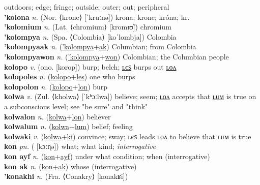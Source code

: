 outdoors; edge; fringe; outside; outer; out; peripheral \label{kolon} \\
\textbf{'kolona} \textit{n.} (Nor. ⟨krone⟩ [ˈkruːnə])
krona; krone; króna; kr. \label{'kolona} \\
\textbf{'kolomium} \textit{n.} (Lat. ⟨chromium⟩ [kromɪʊ̃])
chromium \label{'kolomium} \\
\textbf{'kolompya} \textit{n.} (Spa. ⟨Colombia⟩ [koˈlombja])
Colombia \label{'kolompya} \\
\textbf{'kolompyaak} \textit{n.} (\hyperref['kolompya]{'kolompya}+\hyperref[ak]{ak})
Columbian; from Colombia \label{'kolompyaak} \\
\textbf{'kolompyawon} \textit{n.} (\hyperref['kolompya]{'kolompya}+\hyperref[won]{won})
Colombian; the Columbian people \label{'kolompyawon} \\
\textbf{kolopo} \textit{v.} (ono. [korop])
burp; belch; \hyperref[kolopoles]{ʟєꜱ} burps out \hyperref[kolopolon]{ʟᴏᴧ} \label{kolopo} \\
\textbf{kolopoles} \textit{n.} (\hyperref[kolopo]{kolopo}+\hyperref[les]{les})
one who burps \label{kolopoles} \\
\textbf{kolopolon} \textit{n.} (\hyperref[kolopo]{kolopo}+\hyperref[lon]{lon})
burp \label{kolopolon} \\
\textbf{kolwa} \textit{v.} (Zul. ⟨kholwa⟩ [ˈkʰɔːlwa])
believe; seem; \hyperref[kolwalon]{ʟᴏᴧ} accepts that \hyperref[kolwalum]{ʟᴜᴍ} is true on a subconscious level; see "be sure" and "think" \label{kolwa} \\
\textbf{kolwalon} \textit{n.} (\hyperref[kolwa]{kolwa}+\hyperref[lon]{lon})
believer \label{kolwalon} \\
\textbf{kolwalum} \textit{n.} (\hyperref[kolwa]{kolwa}+\hyperref[lum]{lum})
belief; feeling \label{kolwalum} \\
\textbf{kolwaki} \textit{v.} (\hyperref[kolwa]{kolwa}+\hyperref[ki]{ki})
convince; sway; ʟєꜱ leads ʟᴏᴧ to believe that ʟᴜᴍ is true \label{kolwaki} \\
\textbf{kon} \textit{pn.} ( [kɔːɳə])
what; what kind; \textit{interrogative} \label{kon} \\
\textbf{kon ayf} \textit{n.} (\hyperref[kon]{kon}+\hyperref[ayf]{ayf})
under what condition; when (interrogative) \label{kon ayf} \\
\textbf{kon ak} \textit{n.} (\hyperref[kon]{kon}+\hyperref[ak]{ak})
whose (interrogative) \label{kon ak} \\
\textbf{'konakhi} \textit{n.} (Fra. ⟨Conakry⟩ [konakʁi])
